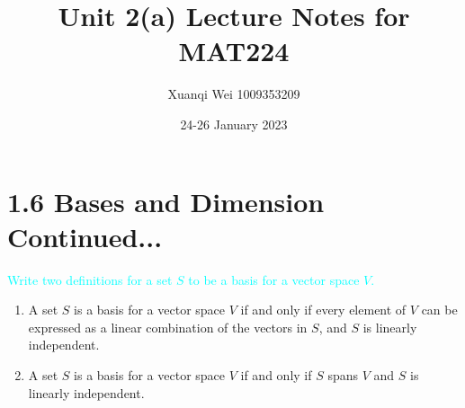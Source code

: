 \documentclass[fontsize=12pt]{scrartcl}
\title{Unit 2(a) Lecture Notes for MAT224}
\author{Xuanqi Wei 1009353209}
\date{24-26 January 2023}
\begin{document}
\maketitle

\newpage

\section{1.6 Bases and Dimension Continued...}

\textcolor{cyan}{Write two definitions for a set $S$ to be a basis for a vector space $V$.}

\begin{enumerate}
	\item A set $S$ is a basis for a vector space $V$ if and only if every element of $V$ can be expressed as a linear combination of the vectors in $S$, and $S$ is linearly independent.
	\item A set $S$ is a basis for a vector space $V$ if and only if $S$ spans $V$ and $S$ is linearly independent.
\end{enumerate}
\\
\end{document}
